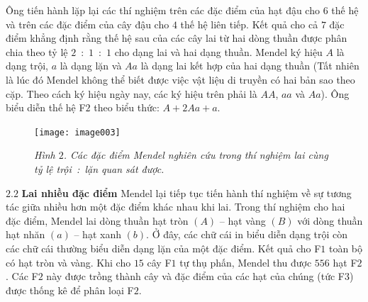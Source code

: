 \begin{multicols}{2}
	\vskip 0.1cm
	Ông tiến hành lặp lại các thí nghiệm trên các đặc điểm của hạt đậu cho $6$ thế hệ và trên các đặc điểm của cây đậu cho $4$ thế hệ liên tiếp. Kết quả cho cả $7$ đặc điểm khẳng định rằng thế hệ sau của các cây lai từ hai dòng thuần được phân chia theo tỷ lệ $2$~:~$1$~:~$1$ cho dạng lai và hai dạng thuần.
	\vskip 0.1cm
	Mendel ký hiệu $A$ là dạng trội, $a$ là dạng lặn và $Aa$ là dạng lai kết hợp của hai dạng thuần (Tất nhiên là lúc đó Mendel không thể biết được việc vật liệu di truyền có hai bản sao theo cặp. Theo cách ký hiệu ngày nay, các ký hiệu trên phải là $AA$, $aa$ và $Aa$). Ông biểu diễn thế hệ F$2$ theo biểu thức: $A + 2Aa + a$.
	\begin{figure}[H]
		\centering
		\vspace*{-5pt}
		\captionsetup{labelformat= empty, justification=centering}
		\texttt{[image: image003]}
		\caption{\small\textit{\color{timhieukhoahoc}Hình $2$. Các đặc điểm Mendel nghiên cứu trong thí nghiệm lai cùng tỷ lệ trội~:~lặn quan sát được.}}
		\vspace*{-10pt}
	\end{figure}
	$\pmb{2.2}$ \textbf{\color{timhieukhoahoc}Lai nhiều đặc điểm}
	\vskip 0.1cm
	Mendel lại tiếp tục tiến hành thí nghiệm về sự tương tác giữa nhiều hơn một đặc điểm khác nhau khi lai. Trong thí nghiệm cho hai đặc điểm, Mendel lai dòng thuần hạt tròn $(A)$ -- hạt vàng $(B)$ với dòng thuần hạt nhăn $(a)$ -- hạt xanh $(b)$. Ở đây, các chữ cái in biểu diễn dạng trội còn các chữ cái thường biểu diễn dạng lặn của một đặc điểm. Kết quả cho F$1$ toàn bộ có hạt tròn và vàng. Khi cho $15$ cây F$1$ tự thụ phấn, Mendel thu được $556$ hạt F$2$. Các F$2$ này được trồng thành cây và đặc điểm của các hạt của chúng (tức F$3$) được thống kê để phân loại F$2$.
	\begin{table}[H]
		\vspace*{-5pt}
		\centering
		\captionsetup{labelformat= empty, justification=centering}
\end{table}
\end{multicols}
